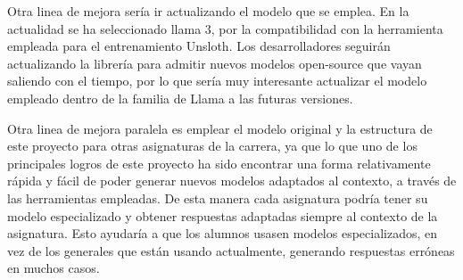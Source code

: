  Otra linea de mejora sería ir actualizando el modelo que se emplea. En la actualidad se ha seleccionado llama 3, por la compatibilidad con la herramienta empleada para el entrenamiento Unsloth. Los desarrolladores seguirán actualizando la librería para admitir nuevos modelos open-source que vayan saliendo con el tiempo, por lo que sería muy interesante actualizar el modelo empleado dentro de la familia de Llama a las futuras versiones.

 Otra linea de mejora paralela es emplear el modelo original y la estructura de este proyecto para otras asignaturas de la carrera, ya que lo que uno de los principales logros de este proyecto ha sido encontrar una forma relativamente rápida y fácil de poder generar nuevos modelos adaptados al contexto, a través de las herramientas empleadas. De esta manera cada asignatura podría tener su modelo especializado y obtener respuestas adaptadas siempre al contexto de la asignatura. Esto ayudaría a que los alumnos usasen modelos especializados, en vez de los generales que están usando actualmente, generando respuestas erróneas en muchos casos.
 
